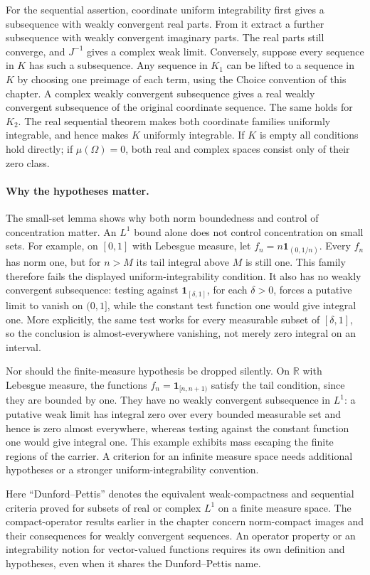 For the sequential assertion, coordinate uniform integrability first
gives a subsequence with weakly convergent real parts. From it extract
a further subsequence with weakly convergent imaginary parts. The real
parts still converge, and $J^{-1}$ gives a complex weak limit.
Conversely, suppose every sequence in $K$ has such a subsequence.
Any sequence in $K_1$ can be lifted to a sequence in $K$ by choosing
one preimage of each term, using the Choice convention of this chapter.
A complex weakly convergent subsequence gives a real weakly convergent
subsequence of the original coordinate sequence. The same holds for
$K_2$. The real sequential theorem makes both coordinate families
uniformly integrable, and hence makes $K$ uniformly integrable.
If $K$ is empty all conditions hold directly; if $\mu(\Omega)=0$,
both real and complex spaces consist only of their zero class.
\Done

\paragraph{Why the hypotheses matter.}
The small-set lemma shows why both norm boundedness and control of
concentration matter. An $L^1$ bound alone does not control concentration
on small sets.
For example, on $[0,1]$ with Lebesgue measure, let
$f_n=n\mathbf{1}_{(0,1/n)}$. Every $f_n$ has norm one, but for
$n>M$ its tail integral above $M$ is still one. This family therefore
fails the displayed uniform-integrability condition. It also has no
weakly convergent subsequence: testing against
$\mathbf{1}_{[\delta,1]}$, for each $\delta>0$, forces a putative
limit to vanish on $(0,1]$, while the constant test function one
would give integral one. More explicitly, the same test works for
every measurable subset of $[\delta,1]$, so the conclusion is
almost-everywhere vanishing, not merely zero integral on an interval.

Nor should the finite-measure hypothesis be dropped silently. On
$\mathbb{R}$ with Lebesgue measure, the functions
$f_n=\mathbf{1}_{[n,n+1)}$ satisfy the tail condition, since they are
bounded by one. They have no weakly convergent subsequence in $L^1$:
a putative weak limit has integral zero over every bounded measurable
set and hence is zero almost everywhere, whereas testing against the
constant function one would give integral one. This example exhibits
mass escaping the finite regions of the carrier. A criterion for an
infinite measure space needs additional hypotheses or a stronger
uniform-integrability convention.

Here ``Dunford--Pettis'' denotes the equivalent weak-compactness and
sequential criteria proved for subsets of real or complex $L^1$ on a finite
measure space.
The compact-operator results earlier in the chapter concern norm-compact
images and their consequences for weakly convergent sequences. An
operator property or an integrability notion for vector-valued functions
requires its own definition and hypotheses, even when it shares the
Dunford--Pettis name.

